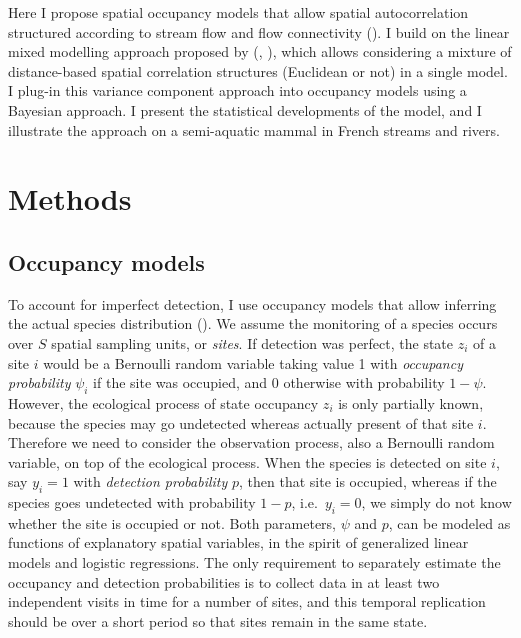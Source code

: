 \documentclass[
  11pt,
  a4paper,
]{article}
\begin{document}
Here I propose spatial occupancy models that allow spatial autocorrelation structured according to stream flow and flow connectivity (). I build on the linear mixed modelling approach proposed by (, ), which allows considering a mixture of distance-based spatial correlation structures (Euclidean or not) in a single model. I plug-in this variance component approach into occupancy models using a Bayesian approach. I present the statistical developments of the model, and I illustrate the approach on a semi-aquatic mammal in French streams and rivers.

\section{Methods}\label{methods}

\subsection{Occupancy models}\label{occupancy-models}

To account for imperfect detection, I use occupancy models that allow inferring the actual species distribution (). We assume the monitoring of a species occurs over \(S\) spatial sampling units, or \emph{sites}. If detection was perfect, the state \(z_i\) of a site \(i\) would be a Bernoulli random variable taking value 1 with \emph{occupancy probability} \(\psi_i\) if the site was occupied, and 0 otherwise with probability \(1-\psi\). However, the ecological process of state occupancy \(z_i\) is only partially known, because the species may go undetected whereas actually present of that site \(i\). Therefore we need to consider the observation process, also a Bernoulli random variable, on top of the ecological process. When the species is detected on site \(i\), say \(y_i = 1\) with \emph{detection probability} \(p\), then that site is occupied, whereas if the species goes undetected with probability \(1-p\), i.e.~\(y_i = 0\), we simply do not know whether the site is occupied or not. Both parameters, \(\psi\) and \(p\), can be modeled as functions of explanatory spatial variables, in the spirit of generalized linear models and logistic regressions. The only requirement to separately estimate the occupancy and detection probabilities is to collect data in at least two independent visits in time for a number of sites, and this temporal replication should be over a short period so that sites remain in the same state.
\end{document}
